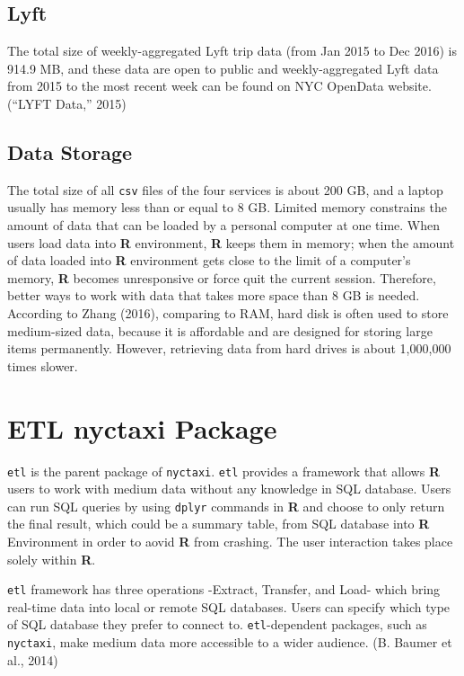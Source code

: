 \documentclass[12pt,twoside]{reedthesis}
\theoremstyle{definition}
\theoremstyle{definition}
\theoremstyle{definition}
\theoremstyle{remark}
\begin{document}
\subsection{Lyft}\label{lyft-1}

The total size of weekly-aggregated Lyft trip data (from Jan 2015 to Dec
2016) is 914.9 MB, and these data are open to public and
weekly-aggregated Lyft data from 2015 to the most recent week can be
found on NYC OpenData website. (``LYFT Data,'' 2015)

\subsection{Data Storage}\label{data-storage}

The total size of all \texttt{csv} files of the four services is about
200 GB, and a laptop usually has memory less than or equal to 8 GB.
Limited memory constrains the amount of data that can be loaded by a
personal computer at one time. When users load data into \textbf{R}
environment, \textbf{R} keeps them in memory; when the amount of data
loaded into \textbf{R} environment gets close to the limit of a
computer's memory, \textbf{R} becomes unresponsive or force quit the
current session. Therefore, better ways to work with data that takes
more space than 8 GB is needed. According to Zhang (2016), comparing to
RAM, hard disk is often used to store medium-sized data, because it is
affordable and are designed for storing large items permanently.
However, retrieving data from hard drives is about 1,000,000 times
slower.

\section{ETL nyctaxi Package}\label{etl-nyctaxi-package}

\texttt{etl} is the parent package of \texttt{nyctaxi}. \texttt{etl}
provides a framework that allows \textbf{R} users to work with medium
data without any knowledge in SQL database. Users can run SQL queries by
using \texttt{dplyr} commands in \textbf{R} and choose to only return
the final result, which could be a summary table, from SQL database into
\textbf{R} Environment in order to aovid \textbf{R} from crashing. The
user interaction takes place solely within \textbf{R}.

\texttt{etl} framework has three operations -Extract, Transfer, and
Load- which bring real-time data into local or remote SQL databases.
Users can specify which type of SQL database they prefer to connect to.
\texttt{etl}-dependent packages, such as \texttt{nyctaxi}, make medium
data more accessible to a wider audience. (B. Baumer et al., 2014)
\end{document}
